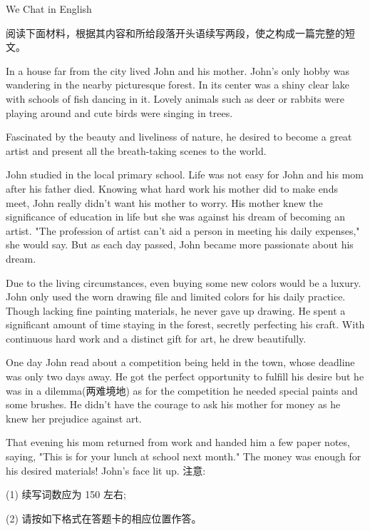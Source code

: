 \documentclass{英语试卷}
\begin{document}
\par We Chat in English\par
{}
\par 阅读下面材料，根据其内容和所给段落开头语续写两段，使之构成一篇完整的短文。\par
\par In a house far from the city lived John and his mother. John's only hobby was wandering in the nearby picturesque forest. In its center was a shiny clear lake with schools of fish dancing in it. Lovely animals such as deer or rabbits were playing around and cute birds were singing in trees.\par
\par Fascinated by the beauty and liveliness of nature, he desired to become a great artist and present all the breath-taking scenes to the world.\par
\par John studied in the local primary school. Life was not easy for John and his mom after his father died. Knowing what hard work his mother did to make ends meet, John really didn't want his mother to worry. His mother knew the significance of education in life but she was against his dream of becoming an artist. "The profession of artist can't aid a person in meeting his daily expenses," she would say. But as each day passed, John became more passionate about his dream.\par
\par Due to the living circumstances, even buying some new colors would be a luxury. John only used the worn drawing file and limited colors for his daily practice. Though lacking fine painting materials, he never gave up drawing. He spent a significant amount of time staying in the forest, secretly perfecting his craft. With continuous hard work and a distinct gift for art, he drew beautifully.\par
\par One day John read about a competition being held in the town, whose deadline was only two days away. He got the perfect opportunity to fulfill his desire but he was in a dilemma(两难境地) as for the competition he needed special paints and some brushes. He didn't have the courage to ask his mother for money as he knew her prejudice against art.\par
\par That evening his mom returned from work and handed him a few paper notes, saying, "This is for your lunch at school next month." The money was enough for his desired materials! John's face lit up. 注意:\par
\par (1) 续写词数应为 150 左右;\par
\par (2) 请按如下格式在答题卡的相应位置作答。\par
{}
\end{document}
